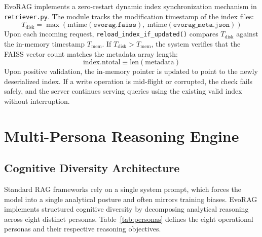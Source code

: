 EvoRAG implements a zero-restart dynamic index synchronization mechanism in \texttt{retriever.py}. The module tracks the modification timestamp of the index files:
\begin{equation}
T_{\text{disk}} = \max\left(\text{mtime}(\texttt{evorag.faiss}),\ \text{mtime}(\texttt{evorag\_meta.json})\right)
\end{equation}
Upon each incoming request, \texttt{reload\_index\_if\_updated()} compares $T_{\text{disk}}$ against the in-memory timestamp $T_{\text{mem}}$. If $T_{\text{disk}} > T_{\text{mem}}$, the system verifies that the FAISS vector count matches the metadata array length:
\begin{equation}
\text{index.ntotal} \equiv \text{len}(\text{metadata})
\end{equation}
Upon positive validation, the in-memory pointer is updated to point to the newly deserialized index. If a write operation is mid-flight or corrupted, the check fails safely, and the server continues serving queries using the existing valid index without interruption.

\section{Multi-Persona Reasoning Engine}
\label{sec:persona_engine}

\subsection{Cognitive Diversity Architecture}
Standard RAG frameworks rely on a single system prompt, which forces the model into a single analytical posture and often mirrors training biases. EvoRAG implements structured cognitive diversity by decomposing analytical reasoning across eight distinct personas. Table~\ref{tab:personas} defines the eight operational personas and their respective reasoning objectives.

